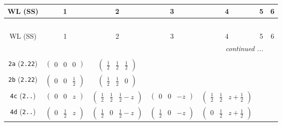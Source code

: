 \documentclass[fleqn,9pt,landscape]{jsarticle}
\begin{document}
\begin{center}
\renewcommand{\arraystretch}{1.2}
\begin{longtable}{ccccccc}
 \hline \hline
WL (SS) & 1 & 2 & 3 & 4 & 5 & 6 \\ \hline \endfirsthead

\multicolumn{6}{l}{\tablename\ \thetable{}} \\
 \hline \hline
WL (SS) & 1 & 2 & 3 & 4 & 5 & 6 \\ \hline \endhead

 \hline \hline
\multicolumn{6}{r}{\footnotesize\it continued ...} \\ \endfoot

 \hline \hline
\multicolumn{6}{r}{} \\ \endlastfoot

{\tt 2a} ({\tt 2.22}) & $ \begin{pmatrix} 0 & 0 & 0 \end{pmatrix} $ & $ \begin{pmatrix} \frac{1}{2} & \frac{1}{2} & \frac{1}{2} \end{pmatrix} $ & $  $ & $  $ & $  $ & $  $ \\ \hline
{\tt 2b} ({\tt 2.22}) & $ \begin{pmatrix} 0 & 0 & \frac{1}{2} \end{pmatrix} $ & $ \begin{pmatrix} \frac{1}{2} & \frac{1}{2} & 0 \end{pmatrix} $ & $  $ & $  $ & $  $ & $  $ \\ \hline
{\tt 4c} ({\tt 2..}) & $ \begin{pmatrix} 0 & 0 & z \end{pmatrix} $ & $ \begin{pmatrix} \frac{1}{2} & \frac{1}{2} & \frac{1}{2} - z \end{pmatrix} $ & $ \begin{pmatrix} 0 & 0 & - z \end{pmatrix} $ & $ \begin{pmatrix} \frac{1}{2} & \frac{1}{2} & z + \frac{1}{2} \end{pmatrix} $ & $  $ & $  $ \\ \hline
{\tt 4d} ({\tt 2..}) & $ \begin{pmatrix} 0 & \frac{1}{2} & z \end{pmatrix} $ & $ \begin{pmatrix} \frac{1}{2} & 0 & \frac{1}{2} - z \end{pmatrix} $ & $ \begin{pmatrix} \frac{1}{2} & 0 & - z \end{pmatrix} $ & $ \begin{pmatrix} 0 & \frac{1}{2} & z + \frac{1}{2} \end{pmatrix} $ & $  $ & $  $ \\ \hline

\end{longtable}
\end{center}
\end{document}
